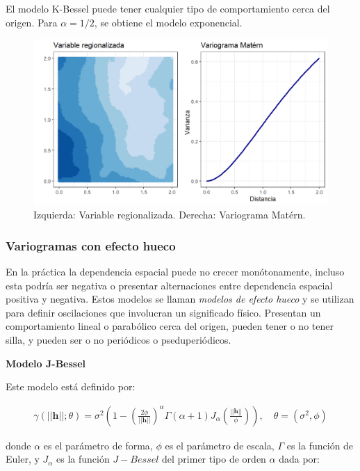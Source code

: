 \documentclass[
]{book}
\begin{document}
El modelo K-Bessel puede tener cualquier tipo de comportamiento cerca del origen. Para \(\alpha=1/2\), se obtiene el modelo exponencial.

\begin{figure}
\includegraphics[width=17.78in]{figuras/otros/mat_var} \caption{Izquierda: Variable regionalizada. Derecha: Variograma Matérn.}\label{fig:matvar}
\end{figure}

\hypertarget{variogramas-con-efecto-hueco}{%
\subsubsection*{Variogramas con efecto hueco}\label{variogramas-con-efecto-hueco}}

En la práctica la dependencia espacial puede no crecer monótonamente, incluso esta podría ser negativa o presentar alternaciones entre dependencia espacial positiva y negativa. Estos modelos se llaman \textit{modelos de efecto hueco} y se utilizan para definir oscilaciones que involucran un significado físico. Presentan un comportamiento lineal o parabólico cerca del origen, pueden tener o no tener silla, y pueden ser o no periódicos o pseduperiódicos.

\textbf{Modelo J-Bessel}

Este modelo está definido por:

\begin{align}
    \gamma(||\textbf{h}||;\theta)=\sigma^2\left(1-\left(\frac{2\phi}{||\textbf{h}||} \right)^{\alpha} \Gamma(\alpha+1)J_\alpha \left(\frac{||\textbf{h}||}{\phi} \right) \right),\quad \theta=(\sigma^2,\phi)
\end{align}

donde \(\alpha\) es el parámetro de forma, \(\phi\) es el parámetro de escala, \(\Gamma\) es la función de Euler, y \(J_\alpha\) es la función \(J-Bessel\) del primer tipo de orden \(\alpha\) dada por:
\end{document}
